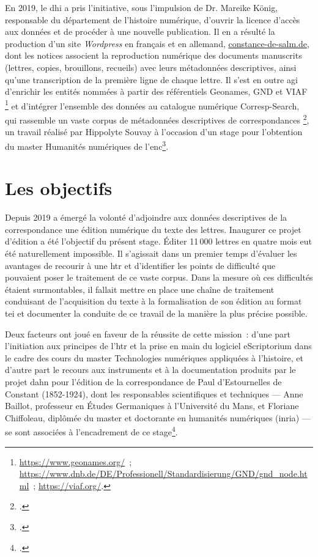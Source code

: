 \documentclass[a4paper,12pt,twoside]{book}
\begin{document}
			En 2019, le \gls{dhi} a pris l'initiative, sous l'impulsion de Dr. Mareike König, responsable du département de l'histoire numérique, d'ouvrir la licence d'accès aux données et de procéder à une nouvelle publication. Il en a résulté la production d'un site \textit{Wordpress} en français et en allemand, \href{https://constance-de-salm.de}{\textsf{constance-de-salm.de}}, dont les notices associent la reproduction numérique des documents manuscrits (lettres, copies, brouillons, recueils) avec leurs métadonnées descriptives, ainsi qu'une transcription de la première ligne de chaque lettre. Il s'est en outre agi d'enrichir les entités nommées à partir des référentiels Geonames, GND et VIAF%
			\footnote{%
				\url{https://www.geonames.org/}~; \url{https://www.dnb.de/DE/Professionell/Standardisierung/GND/gnd_node.html}~;%
				\url{https://viaf.org/}.} %
			et d'intégrer l'ensemble des données au catalogue numérique Corresp-Search, qui rassemble un vaste corpus de métadonnées descriptives de correspondances%
			\footcite{CorrespSearchSearchScholarly2021}, 
			un travail réalisé par Hippolyte Souvay à l'occasion d'un stage pour l'obtention du master Humanités numériques de l'\gls{enc}\footcite{souvayCorrespondanceConstanceSalm2021}.
			
		\section*{Les objectifs}
			Depuis 2019 a émergé la volonté d'adjoindre aux données descriptives de la correspondance une édition numérique du texte des lettres. Inaugurer ce projet d'édition a été l'objectif du présent stage. Éditer 11\,000 lettres en quatre mois eut été naturellement impossible. Il s'agissait dans un premier temps d'évaluer les avantages de recourir à une \gls{htr} et d'identifier les points de difficulté que pouvaient poser le traitement de ce vaste corpus. Dans la mesure où ces difficultés étaient surmontables, il fallait mettre en place une chaîne de traitement conduisant de l'acquisition du texte à la formalisation de son édition au format \gls{tei} et documenter la conduite de ce travail de la manière la plus précise possible.
			
			Deux facteurs ont joué en faveur de la réussite de cette mission~: d'une part l'initiation aux principes de l'\gls{htr} et la prise en main du logiciel eScriptorium dans le cadre des cours du master Technologies numériques appliquées à l'histoire, et d'autre part le recours aux instruments et à la documentation produits par le projet \gls{dahn} pour l'édition de la correspondance de Paul d’Estournelles de Constant (1852-1924), dont les responsables scientifiques et techniques --- Anne Baillot, professeur en Études Germaniques à l'Université du Mans, et Floriane Chiffoleau, diplômée du master et doctorante en humanités numériques (\gls{inria}) --- se sont associées à l'encadrement de ce stage\footcite{chiffoleauDAHNProject}.
			
\end{document}
